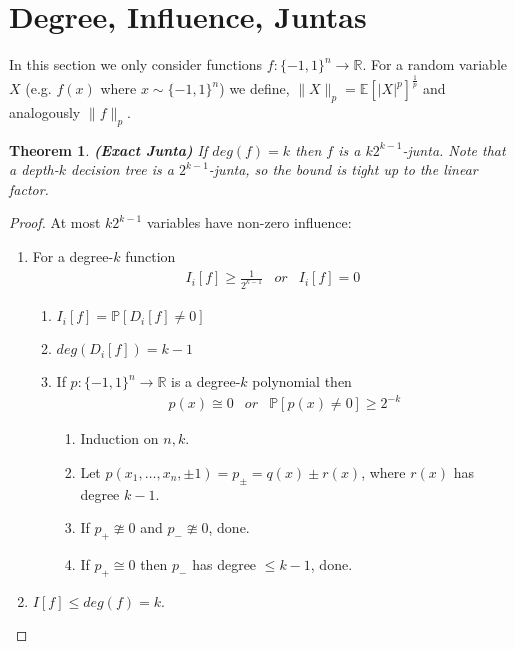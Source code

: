 \documentclass{sig-alternate}
\newtheorem{theorem}{Theorem}[section]
\begin{document}
\section{Degree, Influence, Juntas}
\noindent In this section we only consider functions $f:\{-1, 1\}^n \rightarrow \mathbb{R}$.
For a random variable $X$ (e.g. $f(x)$ where $x \sim \{-1, 1\}^n$) we define, $\|X\|_p = \mathbb{E}[|X|^p]^{\frac{1}{p}}$ and analogously $\|f\|_p$.
\begin{theorem} {\bf (Exact Junta)}
If $deg(f) = k$ then $f$ is a $k2^{k-1}$-junta. Note that a depth-$k$ decision tree is a $2^{k-1}$-junta, so the bound is tight up to the linear factor.
\end{theorem}
\begin{proof}
At most $k2^{k-1}$ variables have non-zero influence:
\begin{enumerate}
\item For a degree-$k$ function \begin{eqnarray*} I_i[f] \geq \frac{1}{2^{k-1}} & or & I_i[f] = 0 \end{eqnarray*}
	\begin{enumerate}
		\item $I_i[f] = \mathbb{P}[D_i[f] \neq 0]$
		\item $deg(D_i[f]) = k - 1$ 
		\item If $p:\{-1,1\}^n \rightarrow \mathbb{R}$ is a degree-$k$ polynomial then \begin{eqnarray*} p(x) \cong 0 & or & \mathbb{P}[p(x) \neq 0] \geq 2^{-k} \end{eqnarray*}
		\begin{enumerate}
			\item Induction on $n,k$.
			\item Let $p(x_1,\ldots,x_n, \pm 1) = p_{\pm} = q(x) \pm r(x)$, where $r(x)$ has degree $k-1$.
			\item If $p_+ \ncong 0$ and $p_- \ncong 0$, done.
			\item If $p_+ \cong 0$ then $p_-$ has degree $\leq k - 1$, done.
		\end{enumerate}
	\end{enumerate}
\item $I[f] \leq deg(f) = k$. 
\end{enumerate}
\end{proof}
\end{document}
